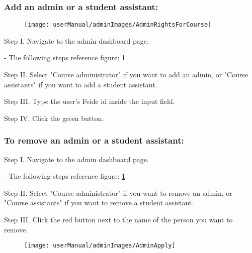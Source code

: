 \subsubsection{Add an admin or a student assistant:}

\begin{figure}[H]
    \texttt{[image: userManual/adminImages/AdminRightsForCourse]}
    \caption{}
    \label{fig:AdminRightsForCourse}
\end{figure}

\begin{userManualItemlist}
    \item[Step I.] Navigate to the admin dashboard page.
    \item[-] The following steps reference figure: \ref{fig:AdminRightsForCourse}
    \item[Step II.] Select "Course administrator" if you want to add an admin, or "Course assistants" if you want to add a student assistant.
    \item[Step III.] Type the user's Feide id inside the input field.
    \item[Step IV.] Click the green button.   
\end{userManualItemlist}

\subsubsection{To remove an admin or a student assistant:}
\begin{userManualItemlist}
    \item[Step I.] Navigate to the admin dashboard page.
    \item[-] The following steps reference figure: \ref{fig:AdminRightsForCourse} 
    \item[Step II.] Select "Course administrator" if you want to remove an admin, or "Course assistants" if you want to remove a student assistant.
    \item[Step III.] Click the red button next to the name of the person you want to remove.
\end{userManualItemlist}

\begin{figure}[H]
    \texttt{[image: userManual/adminImages/AdminApply]}
    \caption{}
    \label{fig:AdminApply}
\end{figure}

